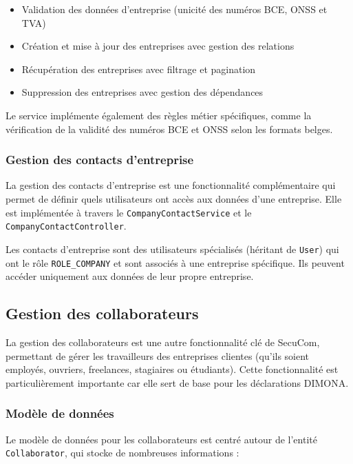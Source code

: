 \begin{itemize}
  \item Validation des données d'entreprise (unicité des numéros BCE, ONSS et TVA)
  \item Création et mise à jour des entreprises avec gestion des relations
  \item Récupération des entreprises avec filtrage et pagination
  \item Suppression des entreprises avec gestion des dépendances
\end{itemize}

Le service implémente également des règles métier spécifiques, comme la vérification de la validité des numéros BCE et ONSS selon les formats belges.

\subsubsection{Gestion des contacts d'entreprise}

La gestion des contacts d'entreprise est une fonctionnalité complémentaire qui permet de définir quels utilisateurs ont accès aux données d'une entreprise. Elle est implémentée à travers le \texttt{CompanyContactService} et le \texttt{CompanyContactController}.

Les contacts d'entreprise sont des utilisateurs spécialisés (héritant de \texttt{User}) qui ont le rôle \texttt{ROLE\_COMPANY} et sont associés à une entreprise spécifique. Ils peuvent accéder uniquement aux données de leur propre entreprise.

\subsection{Gestion des collaborateurs}

La gestion des collaborateurs est une autre fonctionnalité clé de SecuCom, permettant de gérer les travailleurs des entreprises clientes (qu'ils soient employés, ouvriers, freelances, stagiaires ou étudiants). Cette fonctionnalité est particulièrement importante car elle sert de base pour les déclarations DIMONA.

\subsubsection{Modèle de données}

Le modèle de données pour les collaborateurs est centré autour de l'entité \texttt{Collaborator}, qui stocke de nombreuses informations :

